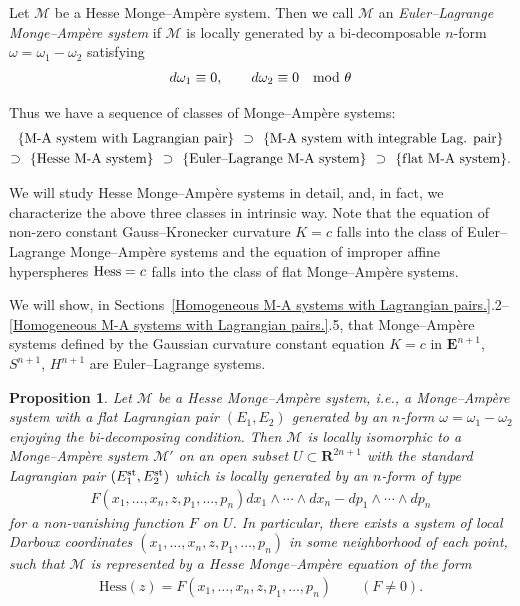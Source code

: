 \documentclass[pdftex]{sigma}
\newtheorem{Prop}[Th]{Proposition}
\begin{document}
\begin{Def}
\label{E-L-M-A-def}
Let $\mathcal{M}$ be a Hesse Monge--Amp{\`e}re system.
Then we call $\mathcal{M}$ an {\it Euler--Lagrange Monge--Amp{\`e}re system}
if $\mathcal{M}$ is locally generated by a bi-decomposable
$n$-form $\omega = \omega_1 - \omega_2$ satisfying
\begin{gather*}
d\omega_1 \equiv 0, \qquad d\omega_2 \equiv 0  \quad \rm{mod}\ \theta
\end{gather*}
\end{Def}


Thus we have a sequence of classes of Monge--Amp{\`e}re systems:
\begin{gather*}
  \text{\{M-A system with Lagrangian pair\} \ $\supset$ \
\{M-A system with integrable Lag. pair\}}\\
\text{$\supset$ \ \{Hesse M-A system\} \ $\supset$ \ \{Euler--Lagrange
M-A system\} \ $\supset$ \ \{f\/lat M-A system\}}.
\end{gather*}

We will study Hesse Monge--Amp{\`e}re systems in detail,
and, in fact, we characterize the above three classes in intrinsic way.
Note that the equation of non-zero
constant Gauss--Kronecker curvature $K = c$ falls into the class of
Euler--Lagrange Monge--Amp{\`e}re systems and the equation of improper af\/f\/ine hyperspheres
${\rm Hess} = c$ falls into the class of f\/lat Monge--Amp{\`e}re systems.

We will show, in Sections~\ref{Homogeneous M-A systems with Lagrangian pairs.}.2--\ref{Homogeneous M-A systems with Lagrangian pairs.}.5,
that Monge--Amp{\`e}re systems def\/ined by
the Gaussian curvature constant equation $K=c$
in ${\mathbf{E}}^{n+1}$, $S^{n+1}$, $H^{n+1}$ are Euler--Lagrange systems.


\begin{Prop}
\label{Hesse-MA}
Let $\mathcal{M}$ be a Hesse Monge--Amp{\`e}re system, i.e.,
a Monge--Amp{\`e}re system
with a flat Lagrangian pair $(E_1,E_2)$ generated by
an $n$-form $\omega = \omega_1-\omega_2$ enjoying
the bi-decomposing condition.
Then $\mathcal{M}$ is locally isomorphic to
a Monge--Amp{\`e}re system $\mathcal{M}'$ on an open subset $U \subset {\mathbf{R}}^{2n+1}$
with the standard Lagrangian pair $(E^{\rm{st}}_1, E^{\rm{st}}_2)$
which is locally generated by an $n$-form of type
\begin{gather*}
F(x_1, \dots, x_n, z, p_1, \dots, p_n) dx_1\wedge\cdots\wedge dx_n - dp_1\wedge\cdots\wedge dp_n
\end{gather*}
for a non-vanishing function $F$ on $U$. In particular,
there exists a system of local Darboux coordinates
$(x_1, \dots, x_n, z, p_1, \dots, p_n)$
in some neighborhood of each point, such that
$\mathcal{M}$ is represented by
a Hesse Monge--Amp{\`e}re equation of the form
\begin{gather*}
\mathrm{Hess}(z) = F(x_1, \dots, x_n, z, p_1, \dots, p_n)
\qquad (F\not=0).
\end{gather*}
\end{Prop}
\end{document}
